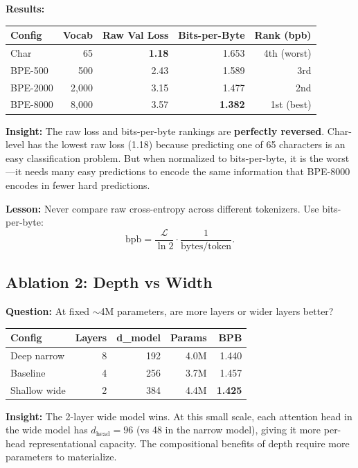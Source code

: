 \textbf{Results:}

\begin{center}
\begin{tabular}{lrrrr}
\toprule
Config & Vocab & Raw Val Loss & Bits-per-Byte & Rank (bpb) \\
\midrule
Char      &    65 & \textbf{1.18} & 1.653 & 4th (worst) \\
BPE-500   &   500 & 2.43 & 1.589 & 3rd \\
BPE-2000  & 2{,}000 & 3.15 & 1.477 & 2nd \\
BPE-8000  & 8{,}000 & 3.57 & \textbf{1.382} & 1st (best) \\
\bottomrule
\end{tabular}
\end{center}

\textbf{Insight:} The raw loss and bits-per-byte rankings are \textbf{perfectly reversed}.
Char-level has the lowest raw loss (1.18) because predicting one of 65 characters is an easy classification problem.
But when normalized to bits-per-byte, it is the worst---it needs many easy predictions to encode the same information that BPE-8000 encodes in fewer hard predictions.

\textbf{Lesson:} Never compare raw cross-entropy across different tokenizers.
Use bits-per-byte:
\[
\text{bpb}
=
\frac{\mathcal{L}}{\ln 2}
\cdot
\frac{1}{\text{bytes/token}} .
\]


\subsection{Ablation 2: Depth vs Width}

\textbf{Question:} At fixed $\sim$4M parameters, are more layers or wider layers better?

\begin{center}
\begin{tabular}{lrrrr}
\toprule
Config & Layers & d\_model & Params & BPB \\
\midrule
Deep narrow   & 8 & 192 & 4.0M & 1.440 \\
Baseline      & 4 & 256 & 3.7M & 1.457 \\
Shallow wide  & 2 & 384 & 4.4M & \textbf{1.425} \\
\bottomrule
\end{tabular}
\end{center}

\textbf{Insight:} The 2-layer wide model wins.
At this small scale, each attention head in the wide model has $d_\text{head} = 96$ (vs 48 in the narrow model), giving it more per-head representational capacity.
The compositional benefits of depth require more parameters to materialize.

